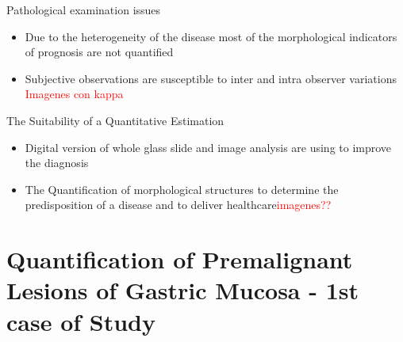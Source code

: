 \documentclass[usenames,dvipsnames]{beamer}
\begin{document}
    
\begin{frame}
\titlepage
\end{frame}


\begin{frame}{Pathological examination issues}
	\begin{itemize}
	 \item Due to the heterogeneity of the disease most of the morphological indicators of prognosis are not quantified
     \pause
	 \item Subjective observations are susceptible to inter and intra observer variations
      \textcolor{red}{Imagenes con kappa}	 
	 
	\end{itemize}
\end{frame}

\begin{frame}{The Suitability of a Quantitative Estimation}
 \begin{itemize}
  \item Digital version of whole glass slide and image analysis are using to improve the diagnosis
  \pause

  \item The Quantification of morphological structures to determine the predisposition of a disease and to deliver healthcare\textcolor{red}{imagenes??}
  
  
  
 \end{itemize}
\end{frame}

\section{Quantification of Premalignant Lesions of Gastric Mucosa - 1st case of Study}
\end{document}
